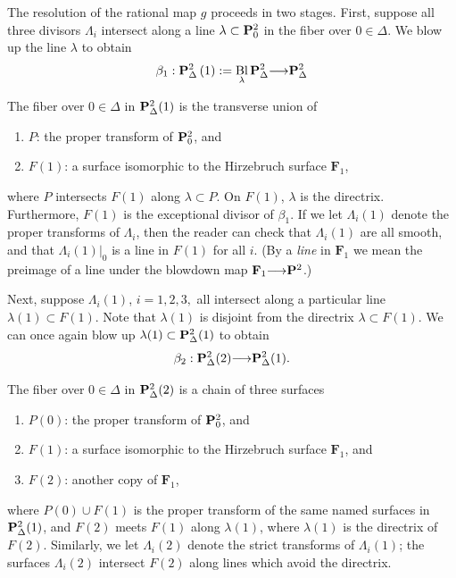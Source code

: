 \documentclass[12pt,reqno]{amsart}
\DeclareMathOperator{\Bl}{Bl}
\renewcommand{\to}{{\longrightarrow}}
\numberwithin{equation}{section}
\newcommand{\F}{\mathbf F}
\begin{document}
The resolution of the rational map $g$ proceeds in two stages.  First,
suppose all three divisors $\Lambda_{i}$ intersect along a line
$\lambda \subset \P^{2}_{0}$ in the fiber over $0 \in \Delta$.  We
blow up the line $\lambda$ to obtain
\[ \beta_{1}: \P^{2}_{\Delta}\left(1 \right) :=
  \Bl_{\lambda}\P^{2}_{\Delta} \to \P^{2}_{\Delta}\]

The fiber over $0 \in \Delta$ in $\P^{2}_{\Delta}(1)$ is the
transverse union of
\begin{enumerate}
\item $P$: the proper transform of $\P^{2}_{0}$, and\\
\item $F(1)$: a surface isomorphic to the Hirzebruch surface $\F_{1}$,
\end{enumerate}
where $P$ intersects $F(1)$ along $\lambda \subset P$.  On $F(1)$,
$\lambda$ is the directrix. Furthermore, $F(1)$ is the exceptional
divisor of $\beta_{1}$.  If we let $\Lambda_{i}(1)$ denote the proper
transforms of $\Lambda_{i}$, then the reader can check that
$\Lambda_{i}(1)$ are all smooth, and that $\Lambda_{i}(1)\big|_{0}$ is
a line in $F(1)$ for all $i$.  (By a {\sl line} in $\F_{1}$ we mean
the preimage of a line under the blowdown map $\F_{1} \to \P^{2}$.)

Next, suppose $\Lambda_{i}(1)$, $i=1,2,3,$ all intersect along a
particular line $\lambda(1) \subset F(1)$. Note that $\lambda(1)$ is
disjoint from the directrix $\lambda \subset F(1)$.  We can once again
blow up $\lambda(1) \subset \P^{2}_{\Delta}(1)$ to obtain
\[\beta_{2}: \P^{2}_{\Delta}(2) \to \P^{2}_{\Delta}(1).\]

The fiber over $0 \in \Delta$ in $\P^{2}_{\Delta}(2)$ is a chain of
three surfaces
\begin{enumerate}
\item $P(0)$: the proper transform of $\P^{2}_{0}$, and\\
\item $F(1)$: a surface isomorphic to the Hirzebruch surface $\F_{1}$, and\\
\item $F(2)$: another copy of $\F_{1}$, 
\end{enumerate}
where $P(0) \cup F(1)$ is the proper transform of the same named
surfaces in $\P^{2}_{\Delta}(1)$, and $F(2)$ meets $F(1)$ along
$\lambda(1)$, where $\lambda(1)$ is the directrix of
$F(2)$. Similarly, we let $\Lambda_{i}(2)$ denote the strict
transforms of $\Lambda_{i}(1)$; the surfaces $\Lambda_{i}(2)$
intersect $F(2)$ along lines which avoid the directrix.
\end{document}
